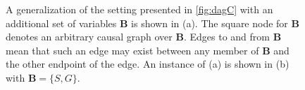 \documentclass[11pt,a4paper,twoside]{article}
\newcommand{\+}[1]{\ensuremath{\mathbf{#1}}}
\begin{document}
\begin{figure}[!ht]
\begin{subfigure}{0.49\textwidth}
			\caption{}
			\label{fig:fsd}
		\end{subfigure}
		\caption{A generalization of the setting presented in \autoref{fig:dagC} with an additional set of variables $\+ B$ is shown in (a). The square node for $\+ B$ denotes an arbitrary causal graph over $\+ B$. Edges to and from $\+ B$ mean that such an edge may exist between any member of $\+ B$ and the other endpoint of the edge. An instance of (a) is shown in (b) with $\+ B = \{S,G\}$.}
	\end{figure}
\end{document}
